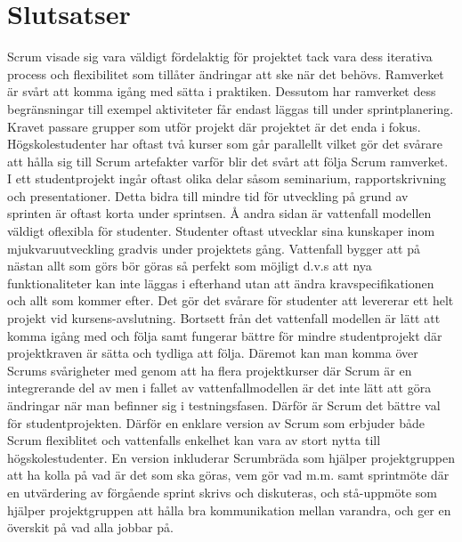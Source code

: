 \section{Slutsatser}
\label{sec:Lieth_Wahid-conclusion}
Scrum visade sig vara väldigt fördelaktig för projektet tack vara dess iterativa process och flexibilitet som tillåter ändringar att ske när det behövs. Ramverket är svårt att komma igång med sätta i praktiken. Dessutom har ramverket dess begränsningar till exempel aktiviteter får endast läggas till under sprintplanering. Kravet passare grupper som utför projekt där projektet är
det enda i fokus. Högskolestudenter har oftast två kurser som går parallellt vilket gör det svårare att hålla sig till Scrum artefakter varför blir det svårt att följa Scrum ramverket. I ett studentprojekt ingår oftast olika delar såsom seminarium, rapportskrivning och presentationer. Detta bidra till mindre tid för utveckling på grund av sprinten är oftast korta under sprintsen. Å andra sidan är vattenfall modellen väldigt oflexibla för studenter. Studenter oftast utvecklar sina kunskaper inom mjukvaruutveckling gradvis under projektets gång. Vattenfall bygger att på nästan allt som görs bör göras så perfekt som möjligt d.v.s att nya funktionaliteter kan inte läggas i efterhand utan att ändra kravspecifikationen och allt som kommer efter. Det gör det svårare för studenter att levererar ett helt projekt vid kursens-avslutning. Bortsett från det vattenfall modellen är lätt att komma igång med och följa samt fungerar bättre för mindre studentprojekt där projektkraven är sätta och tydliga att följa. Däremot kan man komma över Scrums svårigheter med genom att ha flera projektkurser där Scrum är en integrerande del av men i fallet av vattenfallmodellen är det inte lätt att göra ändringar när man befinner sig i testningsfasen. Därför är Scrum det bättre val för studentprojekten.  Därför en enklare version av Scrum som erbjuder både Scrum flexiblitet och vattenfalls enkelhet kan vara av stort nytta till högskolestudenter. En version inkluderar Scrumbräda som hjälper projektgruppen att ha kolla på vad är det som ska göras, vem gör vad m.m. samt sprintmöte där en utvärdering av förgående sprint skrivs och diskuteras, och stå-uppmöte som hjälper projektgruppen att hålla bra kommunikation mellan varandra, och ger en överskit på vad alla jobbar på.    
